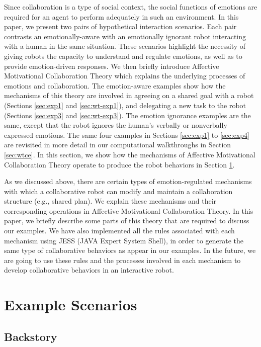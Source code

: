 Since collaboration is a type of social context, the social functions of
emotions are required for an agent to perform adequately in such an environment.
In this paper, we present two pairs of hypothetical interaction scenarios. Each
pair contrasts an emotionally-aware with an emotionally ignorant robot
interacting with a human in the same situation. These scenarios highlight the
necessity of giving robots the capacity to understand and regulate emotions, as
well as to provide emotion-driven responses. We then briefly introduce
Affective Motivational Collaboration Theory which explains the underlying
processes of emotions and collaboration. The emotion-aware examples show how the
mechanisms of this theory are involved in agreeing on a shared goal with a robot
(Sections \ref{sec:exp1} and \ref{sec:wt-exp1}), and delegating a new task to
the robot (Sections \ref{sec:exp3} and \ref{sec:wt-exp3}). The emotion ignorance
examples are the same, except that the robot ignores the human's verbally or
nonverbally expressed emotions. The same four examples in Sections
\ref{sec:exp1} to \ref{sec:exp4} are revisited in more detail in our
computational walkthroughs in Section \ref{sec:wtce}. In this section, we show
how the mechanisms of Affective Motivational Collaboration Theory operate to
produce the robot behaviors in Section \ref{sec:example-scenario}.

As we discussed above, there are certain types of emotion-regulated mechanisms
with which a collaborative robot can modify and maintain a collaboration
structure (e.g., shared plan). We explain these mechanisms and their
corresponding operations in Affective Motivational Collaboration Theory. In
this paper, we briefly describe some parts of this theory that are required to
discuss our examples. We have also implemented all the rules associated with
each mechanism using JESS (JAVA Expert System Shell), in order to generate the
same type of collaborative behaviors as appear in our examples. In the future,
we are going to use these rules and the processes involved in each mechanism to
develop collaborative behaviors in an interactive robot.

\section{Example Scenarios}
\label{sec:example-scenario}

\subsection{Backstory}

